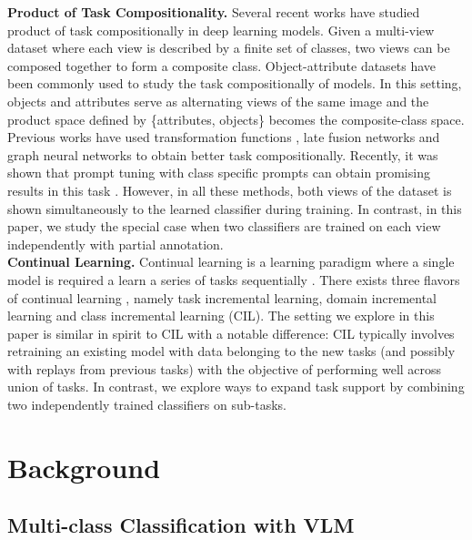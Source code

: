 \documentclass[10pt,twocolumn,letterpaper]{article}
\begin{document}
    \noindent \textbf{Product of Task Compositionality.} Several recent works have studied product of task compositionally in deep learning models. Given a multi-view dataset where each view is described by a finite set of classes, two views can be composed together to form a composite class. Object-attribute datasets have been commonly used to study the task compositionally of models. In this setting, objects and attributes serve as alternating views of the same image and the product space defined by \{attributes, objects\} becomes the composite-class space. Previous works have used transformation functions \cite{Misra_2017_CVPR, Lee_2022_CVPR}, late fusion networks\cite{https://doi.org/10.48550/arxiv.1905.05908} and graph neural networks \cite{ruis2021independent, naeem2021learning} to obtain better task compositionally. Recently, it was shown that prompt tuning with class specific prompts can obtain promising results in this task \cite{csp}. However, in all these methods, both views of the dataset is shown simultaneously to the learned classifier during training. In contrast, in this paper, we study the special case when two classifiers are trained on each view independently with partial annotation.\\ 
   \noindent \textbf{Continual Learning.} Continual learning is a learning paradigm where a single model is required a learn a series of tasks sequentially \cite{thengane2022continualclip, rebuffi-cvpr2017, dytox}. There exists three flavors of continual learning \cite{vandeVen2019ThreeSF}, namely task incremental learning,  domain incremental learning and class incremental learning (CIL). The setting we explore in this paper is similar in spirit to CIL with a notable difference: CIL typically involves retraining an existing model with data belonging to the new tasks (and possibly with replays from previous tasks) with the objective of performing well across union of tasks. In contrast, we explore ways to expand task support by combining  two independently trained classifiers on sub-tasks. %


\section{Background}



\subsection{Multi-class Classification with VLM}
\end{document}

